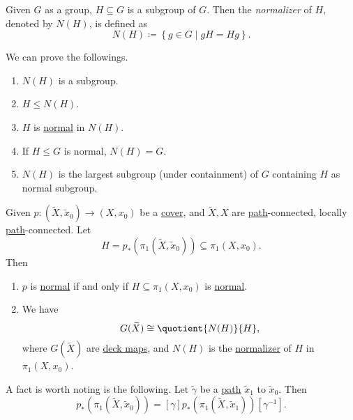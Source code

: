 \begin{definition}[Normalizer]\label{def:normalizer}
	Given \(G\) as a group, \(H\subseteq G\) is a subgroup of \(G\). Then the \emph{normalizer} of \(H\), denoted by \(N(H)\), is defined as
	\[
		N(H) \coloneqq \left\{g\in G \mid gH = H g\right\}.
	\]
\end{definition}

\begin{exercise}
	We can prove the followings.
	\begin{enumerate}
		\item \(N(H)\) is a subgroup.
		\item \(H\leq N(H)\).
		\item \(H\) is \underline{normal} in \(N(H)\).
		\item If \(H\leq G\) is normal, \(N(H) = G\).
		\item \(N(H)\) is the largest subgroup (under containment) of \(G\) containing \(H\) as normal subgroup.
	\end{enumerate}
\end{exercise}

\begin{proposition}\label{prop:lec17}
	Given \(p\colon (\widetilde{X} , \widetilde{x} _0)\to (X, x_0)\) be a \hyperref[def:covering-map]{cover}, and \(\widetilde{X} , X\)
	are \hyperref[def:path]{path}-connected, locally \hyperref[def:path]{path}-connected. Let
	\[
		H = p_\ast (\pi _1(\widetilde{X} , \widetilde{x} _0))\subseteq \pi _1(X, x_0).
	\]
	Then
	\begin{enumerate}
		\item \(p\) is \hyperref[def:normal]{normal} if and only if \(H\subseteq \pi _1(X, x_0)\) is \hyperref[def:normal]{normal}.
		\item We have
		      \[
			      G(\widetilde{X} )\cong \quotient{N(H)}{H},
		      \]
		      where \(G(\widetilde{X} )\) are \hyperref[def:deck-transformation]{deck maps}, and \(N(H)\) is the \hyperref[def:normalizer]{normalizer}
		      of \(H\) in \(\pi _1(X, x_0)\).
	\end{enumerate}
\end{proposition}

\begin{remark}
	A fact is worth noting is the following. Let \(\widetilde{\gamma} \) be a \hyperref[def:path]{path} \(\widetilde{x} _1\) to \(\widetilde{x} _0\).
	Then
	\[
		p_\ast (\pi _1(\widetilde{X} , \widetilde{x} _0))= [\gamma ] p_\ast (\pi _1(\widetilde{X} , \widetilde{x} _1)) [\gamma ^{-1}].
	\]
	\begin{figure}[H]
		\centering
		\label{fig:rmk:lec17:1}
	\end{figure}
\end{remark}